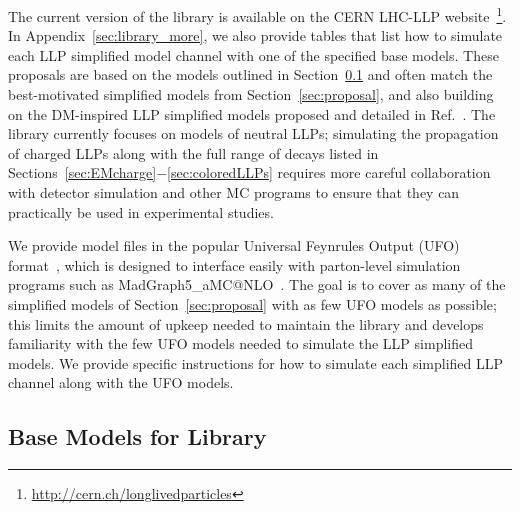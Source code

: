 The current version of the library is available on the CERN LHC-LLP website~\footnote{\url{http://cern.ch/longlivedparticles}}.
In Appendix~\ref{sec:library_more}, we also provide tables that list how to simulate each LLP simplified model channel with one of the specified base models.
These proposals are based on the models outlined in Section~\ref{sec:base} and often match the best-motivated simplified models from Section~\ref{sec:proposal}, and also building on the DM-inspired LLP simplified models proposed and detailed in Ref.~\cite{Buchmueller:2017uqu}.
The library currently focuses on models of neutral LLPs; simulating the propagation of charged LLPs along with the full range of decays listed in Sections~\ref{sec:EMcharge}$-$\ref{sec:coloredLLPs} requires more careful collaboration with detector simulation and other MC programs to ensure that they can practically be used in experimental studies.

We provide model files in the popular Universal Feynrules Output (UFO) format~\cite{Degrande:2011ua}, which is designed to interface easily with parton-level simulation programs such as MadGraph5\_aMC@NLO~\cite{Alwall:2014hca}.
The goal is to cover as many of the simplified models of Section~\ref{sec:proposal} with as few UFO models as possible; this limits the amount of upkeep needed to maintain the library and develops familiarity with the few UFO models needed to simulate the LLP simplified models.
We provide specific instructions for how to simulate each simplified LLP channel along with the UFO models. 

\subsection{Base Models for Library}\label{sec:base}

